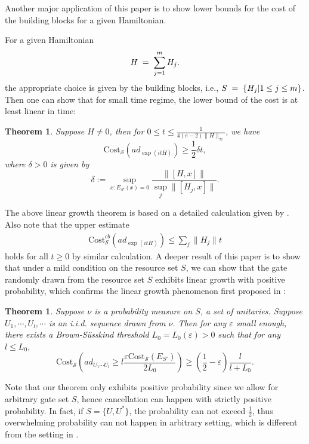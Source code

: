 \documentclass[11pt,reqno]{amsart}
\numberwithin{equation}{section}
\newtheorem{theorem}[lemma]{Theorem}
\newcommand{\mc}{\mathcal}
\newcommand{\Cost}{\mathrm{Cost}}
\newcommand{\pl}{\hspace{.1cm}}
\newcommand{\lel}{\pl = \pl}
\begin{document}
Another major application of this paper is to show lower bounds for the cost of the building blocks for a given Hamiltonian. 

For a given Hamiltonian 
 \begin{equation}\label{haha}
  H \lel \sum_{j=1}^m H_j.
  \end{equation} 
the appropriate choice is given by the building blocks, i.e., $S\lel \{H_j| 1\le j\le m\}$. Then one can show that for small time regime, the lower bound of the cost is at least linear in time:
\begin{theorem}
Suppose $H \neq 0$, then for $0\le t \le \frac{1}{4(e-2)\|H\|_{\infty}}$, we have 
\begin{equation}
\Cost_{\mc S}(ad_{\exp(itH)}) \ge \frac{1}{2}\delta t,
\end{equation}
where $\delta>0$ is given by 
\begin{equation}
\delta:= \sup_{x: E_{S'}(x)=0}\frac{\|[H,x]\|}{\sup_{j}\|[H_j,x]\|}.
\end{equation}
\end{theorem}
The above linear growth theorem is based on a detailed calculation given by \cite{Campbell19}. Also note that the upper estimate 
\begin{align*}
    \Cost_{\mc S}^{cb}(ad_{\exp(itH)}) \le \sum_{j}\|H_j\|t
\end{align*}
holds for all $t\ge 0$ by similar calculation. A deeper result of this paper is to show that under a mild condition on the resource set $S$, we can show that the gate randomly drawn from the resource set $S$ exhibits linear growth with positive probability, which confirms the linear growth phenomenon first proposed in \cite{BS1, BS2}:
\begin{theorem}
    Suppose $\nu$ is a probability measure on $S$, a set of unitaries. Suppose $U_1,\cdots, U_l,\cdots$ is an i.i.d. sequence drawn from $\nu$. Then for any $\varepsilon$ small enough, there exists a Brown-S\"usskind threshold $L_0 = L_0(\varepsilon)>0$ such that for any $l \le L_0$, 
    \begin{equation}
        \Cost_{\mc S}(ad_{U_1\cdots U_l} \ge l \frac{\varepsilon \Cost_{\mc S}(E_{S'})}{2L_0}) \ge (\frac{1}{2} - \varepsilon)\frac{l}{l+L_0}.
    \end{equation}
\end{theorem}
Note that our theorem only exhibits positive probability since we allow for arbitrary gate set $S$, hence cancellation can happen with strictly positive probability. In fact, if $S = \{U,U^*\}$, the probability can not exceed $\frac{1}{2}$, thus overwhelming probability can not happen in arbitrary setting, which is different from the setting in \cite{HFKEH}.
\end{document}
